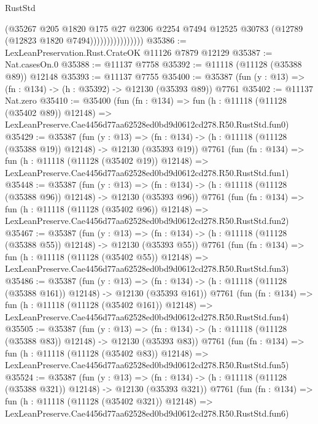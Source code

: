 \begin{lexlean}{RustStd}
\begin{coremodule}
                              (@35267
                                @205
                                @1820
                                @175
                                @27
                                @2306
                                @2254
                                @7494
                                @12525
                                @30783
                                (@12789 (@12823 @1820 @7494))))))))))))))))
@35386 := LexLeanPreservation.Rust.CrateOK @11126 @7879 @12129
@35387 := Nat.casesOn.{0}
@35388 := @11137 @7758
@35392 := @11118 (@11128 (@35388 @89)) @12148
@35393 := @11137 @7755
@35400 := @35387 (fun (y : @13) => (fn : @134) -> (h : @35392) -> @12130 (@35393 @89)) @7761
@35402 := @11137 Nat.zero
@35410 := @35400
    (fun (fn : @134) =>
    fun (h : @11118 (@11128 (@35402 @89)) @12148) =>
    LexLeanPreserve.Cae4456d77aa62528ed0bd9d0612cd278.R50.RustStd.fun0)
@35429 := @35387
    (fun (y : @13) =>
    (fn : @134) -> (h : @11118 (@11128 (@35388 @19)) @12148) -> @12130 (@35393 @19))
    @7761
    (fun (fn : @134) =>
    fun (h : @11118 (@11128 (@35402 @19)) @12148) =>
    LexLeanPreserve.Cae4456d77aa62528ed0bd9d0612cd278.R50.RustStd.fun1)
@35448 := @35387
    (fun (y : @13) =>
    (fn : @134) -> (h : @11118 (@11128 (@35388 @96)) @12148) -> @12130 (@35393 @96))
    @7761
    (fun (fn : @134) =>
    fun (h : @11118 (@11128 (@35402 @96)) @12148) =>
    LexLeanPreserve.Cae4456d77aa62528ed0bd9d0612cd278.R50.RustStd.fun2)
@35467 := @35387
    (fun (y : @13) =>
    (fn : @134) -> (h : @11118 (@11128 (@35388 @55)) @12148) -> @12130 (@35393 @55))
    @7761
    (fun (fn : @134) =>
    fun (h : @11118 (@11128 (@35402 @55)) @12148) =>
    LexLeanPreserve.Cae4456d77aa62528ed0bd9d0612cd278.R50.RustStd.fun3)
@35486 := @35387
    (fun (y : @13) =>
    (fn : @134) -> (h : @11118 (@11128 (@35388 @161)) @12148) -> @12130 (@35393 @161))
    @7761
    (fun (fn : @134) =>
    fun (h : @11118 (@11128 (@35402 @161)) @12148) =>
    LexLeanPreserve.Cae4456d77aa62528ed0bd9d0612cd278.R50.RustStd.fun4)
@35505 := @35387
    (fun (y : @13) =>
    (fn : @134) -> (h : @11118 (@11128 (@35388 @83)) @12148) -> @12130 (@35393 @83))
    @7761
    (fun (fn : @134) =>
    fun (h : @11118 (@11128 (@35402 @83)) @12148) =>
    LexLeanPreserve.Cae4456d77aa62528ed0bd9d0612cd278.R50.RustStd.fun5)
@35524 := @35387
    (fun (y : @13) =>
    (fn : @134) -> (h : @11118 (@11128 (@35388 @321)) @12148) -> @12130 (@35393 @321))
    @7761
    (fun (fn : @134) =>
    fun (h : @11118 (@11128 (@35402 @321)) @12148) =>
    LexLeanPreserve.Cae4456d77aa62528ed0bd9d0612cd278.R50.RustStd.fun6)

\end{coremodule}
\end{lexlean}
